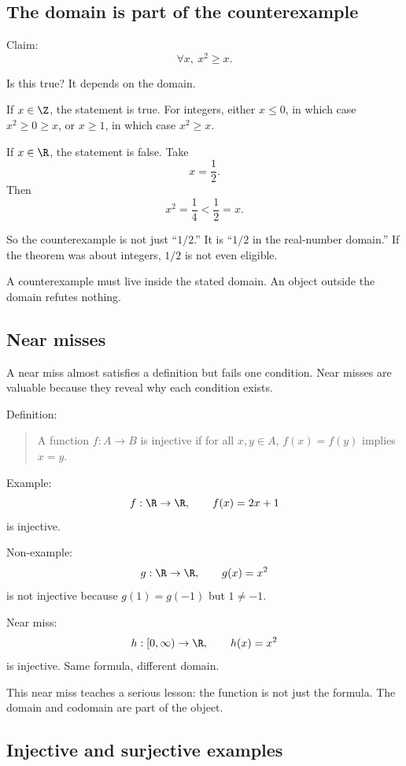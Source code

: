 \subsection{The domain is part of the counterexample}

Claim:
\[
\forall x,\ x^2\geq x.
\]

Is this true? It depends on the domain.

If $x\in\Z$, the statement is true. For integers, either $x\leq0$, in which case $x^2\geq0\geq x$, or $x\geq1$, in which case $x^2\geq x$.

If $x\in\R$, the statement is false. Take
\[
x=\frac12.
\]
Then
\[
x^2=\frac14<\frac12=x.
\]

So the counterexample is not just ``$1/2$.'' It is ``$1/2$ in the real-number domain.'' If the theorem was about integers, $1/2$ is not even eligible.

\begin{trapbox}
A counterexample must live inside the stated domain. An object outside the domain refutes nothing.
\end{trapbox}

\subsection{Near misses}

A near miss almost satisfies a definition but fails one condition. Near misses are valuable because they reveal why each condition exists.

Definition:

\begin{quote}
A function $f:A\to B$ is injective if for all $x,y\in A$, $f(x)=f(y)$ implies $x=y$.
\end{quote}

Example:
\[
f:\R\to\R,\qquad f(x)=2x+1
\]
is injective.

Non-example:
\[
g:\R\to\R,\qquad g(x)=x^2
\]
is not injective because $g(1)=g(-1)$ but $1\neq-1$.

Near miss:
\[
h:[0,\infty)\to\R,\qquad h(x)=x^2
\]
is injective. Same formula, different domain.

This near miss teaches a serious lesson: the function is not just the formula. The domain and codomain are part of the object.

\subsection{Injective and surjective examples}

